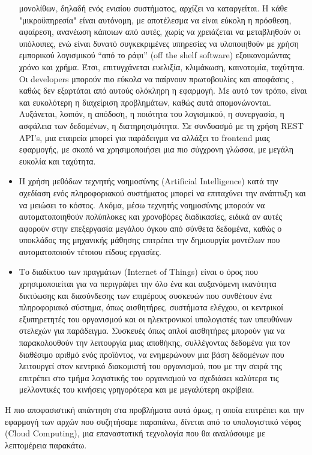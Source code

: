 \documentclass{article}
\begin{document}
\begin{itemize}
μονολίθων, δηλαδή ενός ενιαίου συστήματος, αρχίζει να καταργείται. Η κάθε
"μικροϋπηρεσία" είναι αυτόνομη, με αποτέλεσμα να είναι εύκολη η πρόσθεση,
αφαίρεση, ανανέωση κάποιων από αυτές, χωρίς να χρειάζεται να μεταβληθούν
οι υπόλοιπες, ενώ είναι δυνατό συγκεκριμένες υπηρεσίες να υλοποιηθούν με
χρήση εμπορικού λογισμικού “από το ράφι” (off the
shelf software) εξοικονομώντας χρόνο και χρήμα.
Έτσι, επιτυγχάνεται ευελιξία, κλιμάκωση, καινοτομία, ταχύτητα.
Οι developers μπορούν πιο
εύκολα να παίρνουν πρωτοβουλίες και αποφάσεις , καθώς δεν εξαρτάται από
αυτούς ολόκληρη η εφαρμογή. Με αυτό τον τρόπο, είναι και ευκολότερη η
διαχείριση προβλημάτων, καθώς αυτά απομονώνονται. Αυξάνεται, λοιπόν, η
απόδοση, η ποιότητα του λογισμικού, η συνεργασία, η ασφάλεια των
δεδομένων, η διατηρησιμότητα.
Σε συνδυασμό με τη χρήση REST
API's, μια εταιρεία μπορεί για παράδειγμα να αλλάξει
το frontend μιας εφαρμογής,
με σκοπό να χρησιμοποιήσει μια πιο σύγχρονη γλώσσα, με μεγάλη ευκολία και
ταχύτητα.
\item Η χρήση μεθόδων τεχνητής νοημοσύνης
(Artificial Intelligence)
κατά την σχεδίαση ενός πληροφοριακού συστήματος μπορεί να επιταχύνει την
ανάπτυξη και να μειώσει το κόστος. Ακόμα, μέσω τεχνητής νοημοσύνης μπορούν
να αυτοματοποιηθούν πολύπλοκες και χρονοβόρες διαδικασίες, ειδικά αν αυτές
αφορούν στην επεξεργασία μεγάλου όγκου από σύνθετα δεδομένα, καθώς ο
υποκλάδος της μηχανικής μάθησης επιτρέπει την δημιουργία μοντέλων που
αυτοματοποιούν τέτοιου είδους εργασίες.
\item Το διαδίκτυο των πραγμάτων  (Internet of
Things)  είναι ο όρος που χρησιμοποιείται για να
περιγράψει την όλο ένα και αυξανόμενη ικανότητα δικτύωσης και διασύνδεσης
των επιμέρους συσκευών που συνθέτουν ένα πληροφοριακό σύστημα, όπως
αισθητήρες, συστήματα ελέγχου, οι κεντρικοί εξυπηρετητές του οργανισμού
και οι ηλεκτρονικοί υπολογιστές των υπευθύνων στελεχών για παράδειγμα.
Συσκευές όπως απλοί αισθητήρες μπορούν για να παρακολουθούν την λειτουργία
μιας αποθήκης, συλλέγοντας δεδομένα για τον διαθέσιμο αριθμό ενός
προϊόντος, να ενημερώνουν μια βάση δεδομένων που λειτουργεί στον κεντρικό
διακομιστή του οργανισμού, που με την σειρά της επιτρέπει στο τμήμα
λογιστικής του οργανισμού να σχεδιάσει καλύτερα τις μελλοντικές του
κινήσεις γρηγορότερα και με μεγαλύτερη ακρίβεια.


\end{itemize}
Η πιο αποφασιστική απάντηση στα προβλήματα αυτά όμως, η οποία επιτρέπει
και την εφαρμογή των αρχών που συζητήσαμε παραπάνω, δίνεται από το
υπολογιστικό νέφος (Cloud Computing),
μια επαναστατική τεχνολογία που θα αναλύσουμε με
λεπτομέρεια παρακάτω.
\end{document}
